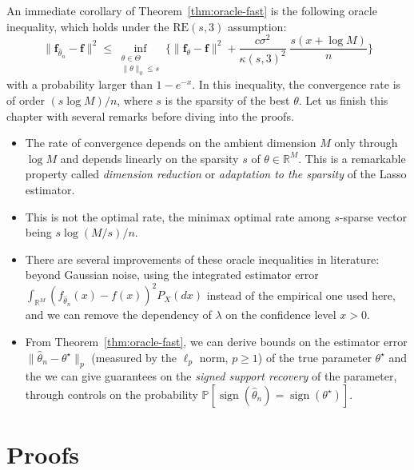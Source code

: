 \documentclass[
	fontsize=11pt, %
	twoside=false, %
	numbers=noenddot, %
]{kaobook}
\renewcommand{\bf}{{\boldsymbol f}}
\renewcommand{\P}{\mathbb P}
\newcommand{\R}{\mathbb R}
\newcommand{\wh}{\widehat}
\newcommand{\norm}[1]{\| #1 \|}
\DeclareMathOperator{\sign}{sign}
\begin{document}
An immediate corollary of Theorem~\ref{thm:oracle-fast} is the following oracle inequality, which holds under the $\text{RE}(s, 3)$ assumption:
\begin{equation*}
	\norm{\bf_{\wh \theta_n} - \bf}^2 \leq 
	\inf_{\substack{\theta \in \Theta \\ \norm{\theta}_0 \leq s}}
	\bigg\{ \norm{\bf_{\theta} - \bf}^2  + \frac{c \sigma^2}{\kappa(s, 3)^2} 
	\; \frac{s(x + \log M)}{n} \bigg\}
\end{equation*}
with a probability larger than $1 - e^{-x}$.
In this inequality, the convergence rate is of order $(s \log M) / n$, where $s$ is the sparsity of the best $\theta$.
Let us finish this chapter with several remarks before diving into the proofs.
\begin{itemize}
	\item The rate of convergence depends on the ambient dimension $M$ only through $\log M$ and depends linearly on the sparsity $s$ of $\theta \in \R^M$. This is a remarkable property called \emph{dimension reduction} or \emph{adaptation to the sparsity} of the Lasso estimator.
	\item This is not the optimal rate, the minimax optimal rate among $s$-sparse vector being $s \log(M / s) / n$. 
	\item There are several improvements of these oracle inequalities in literature: beyond Gaussian noise, using the integrated estimator error $\int_{\R^M} (f_{\wh \theta_n}(x) - f(x))^2 P_X(dx)$ instead of the empirical one used here, and we can remove the dependency of $\lambda$ on the confidence level $x > 0$.
	\item From Theorem~\ref{thm:oracle-fast}, we can derive bounds on the estimator error $\norm{\wh \theta_n - \theta^\star}_p$ (measured by the $\ell_p$ norm, $p \geq 1$) of the true parameter $\theta^\star$ and the we can give guarantees on the \emph{signed support recovery} of the parameter, through controls on the probability 
	$\P[ \sign(\wh \theta_n) = \sign(\theta^\star)]$.
\end{itemize}

\section{Proofs} %
\label{sec:lasso-proofs}
\end{document}
